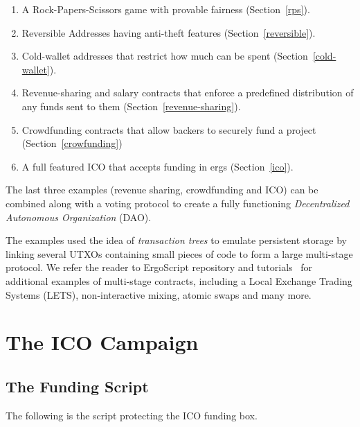 \documentclass[runningheads]{llncs}
\newcommand{\langname}{ErgoScript\xspace}
\begin{document}
\begin{enumerate}
	\item A Rock-Papers-Scissors game with provable fairness (Section~\ref{rps}).
	\item Reversible Addresses having anti-theft features (Section~\ref{reversible}).
	\item Cold-wallet addresses that restrict how much can be spent (Section~\ref{cold-wallet}).
	\item Revenue-sharing and salary contracts that enforce a predefined distribution of any funds sent to them (Section~\ref{revenue-sharing}).
	\item Crowdfunding contracts that allow backers to securely fund a project (Section~\ref{crowfunding})
	\item A full featured ICO that accepts funding in ergs (Section~\ref{ico}). 

\end{enumerate}

The last three examples (revenue sharing, crowdfunding and ICO) can be combined along with a voting protocol to create a fully functioning {\em Decentralized Autonomous Organization} (DAO).


The examples used the idea of {\em transaction trees} to emulate persistent storage by linking several UTXOs containing small pieces of code to form a large multi-stage protocol. 
We refer the reader to \langname repository and tutorials~\cite{langrepo,tutorial,advtutorial} for additional examples of multi-stage contracts, including a Local Exchange Trading Systems (LETS), non-interactive mixing, atomic swaps and many more.




\appendix

\section{The ICO Campaign}

\subsection{The Funding Script}
\label{ico-funding}

The following is the script protecting the ICO funding box.
\end{document}
